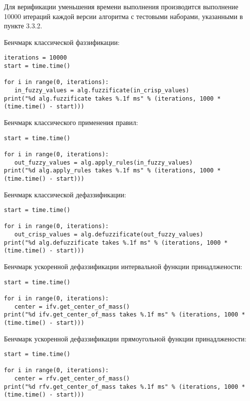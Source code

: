 Для верификации уменьшения времени выполнения производится выполнение 10000 итераций каждой версии алгоритма с тестовыми наборами, указанными в пункте 3.3.2. 

Бенчмарк классической фаззификации:
\begin{lstlisting}[style=pythonstyle,caption={  }, label=lst:func:1]
iterations = 10000
start = time.time()

for i in range(0, iterations):
   in_fuzzy_values = alg.fuzzificate(in_crisp_values)
print("%d alg.fuzzificate takes %.1f ms" % (iterations, 1000 * (time.time() - start)))
\end{lstlisting}

Бенчмарк классического применения правил:
\begin{lstlisting}[style=pythonstyle,caption={  }, label=lst:func:1]
start = time.time()

for i in range(0, iterations):
   out_fuzzy_values = alg.apply_rules(in_fuzzy_values)
print("%d alg.apply_rules takes %.1f ms" % (iterations, 1000 * (time.time() - start)))
\end{lstlisting}

Бенчмарк классической дефаззификации:
\begin{lstlisting}[style=pythonstyle,caption={  }, label=lst:func:1]
start = time.time()

for i in range(0, iterations):
   out_crisp_values = alg.defuzzificate(out_fuzzy_values)
print("%d alg.defuzzificate takes %.1f ms" % (iterations, 1000 * (time.time() - start)))
\end{lstlisting}

Бенчмарк ускоренной дефаззификации интервальной функции принадлжености:

\begin{lstlisting}[style=pythonstyle,caption={  }, label=lst:func:1]
start = time.time()

for i in range(0, iterations):
   center = ifv.get_center_of_mass()
print("%d ifv.get_center_of_mass takes %.1f ms" % (iterations, 1000 * (time.time() - start)))
\end{lstlisting}

Бенчмарк ускоренной дефаззификации прямоугольной функции принадлжености:
\begin{lstlisting}[style=pythonstyle,caption={  }, label=lst:func:1]
start = time.time()

for i in range(0, iterations):
   center = rfv.get_center_of_mass()
print("%d rfv.get_center_of_mass takes %.1f ms" % (iterations, 1000 * (time.time() - start)))
\end{lstlisting}
